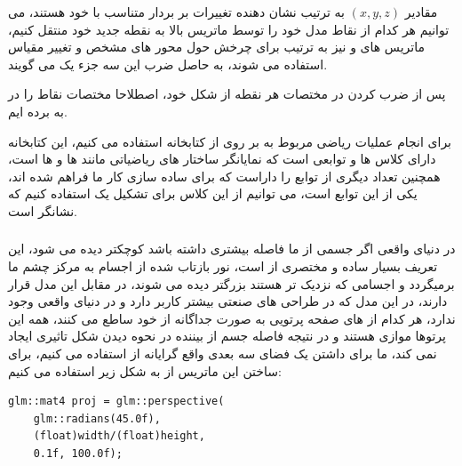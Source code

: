 \documentclass[a4paper, 12pt]{book}
\newcommand{\lrbold}[1]{\lr{\textbf{#1}}}
\newcommand{\lrit}[1]{\lr{\textit{#1}}}
\begin{document}
    مقادیر $(x, y, z)$ به ترتیب نشان دهنده تغییرات بر بردار متناسب با خود هستند، می توانیم هر کدام از نقاط مدل خود را توسط ماتریس بالا به نقطه جدید خود منتقل کنیم، ماتریس های  و  نیز به ترتیب برای چرخش حول محور های مشخص و تغییر مقیاس استفاده می شوند، به حاصل ضرب این سه جزء یک  می گویند.\par
    پس از ضرب کردن  در مختصات هر نقطه از شکل خود، اصطلاحا مختصات نقاط را در  به  برده ایم.\par
    برای انجام عملیات ریاضی مربوط به  بر روی  از کتابخانه \lrbold{GLM} استفاده می کنیم، این کتابخانه دارای کلاس ها و توابعی است که نمایانگر ساختار های ریاضیاتی مانند  ها و  ها است، همچنین تعداد دیگری از توابع را داراست که برای ساده سازی کار ما فراهم شده اند، یکی از این توابع  است، می  توانیم از این کلاس برای تشکیل یک  استفاده کنیم که نشانگر \lrbold{Camera} است.\par
    \vspace*{0.6cm}
    \subsubsection*{}
    \vspace*{0.3cm}

    در دنیای واقعی اگر جسمی از ما فاصله بیشتری داشته باشد کوچکتر دیده می شود، این تعریف بسیار ساده و مختصری از  است، نور بازتاب شده از اجسام به مرکز چشم ما برمیگردد و اجسامی که نزدیک تر هستند بزرگتر دیده می شوند، در مقابل این مدل  قرار دارند، در این مدل که در طراحی های صنعتی بیشتر کاربر دارد و در دنیای واقعی وجود ندارد، هر کدام از  های صفحه پرتویی به صورت جداگانه از خود ساطع می کنند، همه این پرتوها موازی هستند و در نتیجه فاصله جسم از بیننده در نحوه دیدن شکل تاثیری ایجاد نمی کند، ما برای داشتن یک فضای سه بعدی واقع گرایانه از  استفاده می کنیم، برای ساختن این ماتریس از  به شکل زیر استفاده می کنیم:

    \begin{LTR}
    \small
        \begin{lstlisting}[style=C++Style,caption=\lrit{fragment shader to use texture}]
glm::mat4 proj = glm::perspective(
    glm::radians(45.0f),
    (float)width/(float)height,
    0.1f, 100.0f);
        \end{lstlisting}
    \end{LTR}
    \normalsize
    \vspace*{0.3cm}
\end{document}
